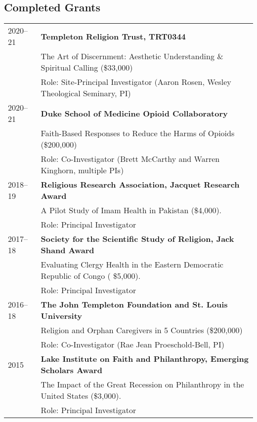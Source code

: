 \subsection*{Completed Grants}
\begin{longtable}{p{} p{}}
2020--21 & \textbf{Templeton Religion Trust, TRT0344} \\
& The Art of Discernment: Aesthetic Understanding \& Spiritual Calling (\$33,000)\\
& Role: Site-Principal Investigator (Aaron Rosen, Wesley Theological Seminary, PI)\\

2020--21 & \textbf{Duke School of Medicine Opioid Collaboratory}\\
& Faith-Based Responses to Reduce the Harms of Opioids (\$200,000) \\
& Role: Co-Investigator (Brett McCarthy and Warren Kinghorn, multiple PIs)\\

2018--19 & \textbf{Religious Research Association, Jacquet Research Award}\\
& A Pilot Study of Imam Health in Pakistan (\$4,000). \\
& Role: Principal Investigator\\

2017--18 & \textbf{Society for the Scientific Study of Religion, Jack Shand Award} \\
& Evaluating Clergy Health in the Eastern Democratic Republic of Congo ( \$5,000). \\
& Role: Principal Investigator\\

2016--18 & \textbf{The John Templeton Foundation and St. Louis University}\\
& Religion and Orphan Caregivers in 5 Countries (\$200,000)\\
& Role: Co-Investigator (Rae Jean Proeschold-Bell, PI)\\

2015 & \textbf{Lake Institute on Faith and Philanthropy, Emerging Scholars Award} \\
& The Impact of the Great Recession on Philanthropy in the United States (\$3,000). \\
& Role: Principal Investigator\\
\end{longtable}

